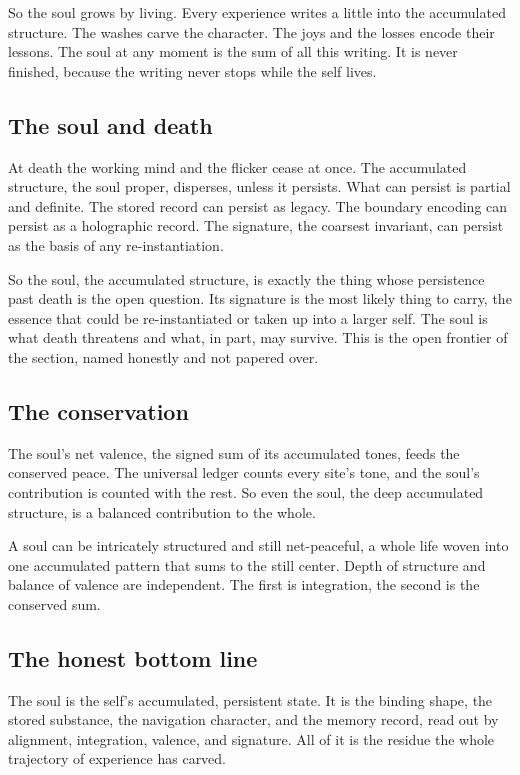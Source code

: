 So the soul grows by living. Every experience writes a little into the accumulated structure. The washes carve the character. The joys and the losses encode their lessons. The soul at any moment is the sum of all this writing. It is never finished, because the writing never stops while the self lives.

\subsection{The soul and death}

At death the working mind and the flicker cease at once. The accumulated structure, the soul proper, disperses, unless it persists. What can persist is partial and definite. The stored record can persist as legacy. The boundary encoding can persist as a holographic record. The signature, the coarsest invariant, can persist as the basis of any re-instantiation.

So the soul, the accumulated structure, is exactly the thing whose persistence past death is the open question. Its signature is the most likely thing to carry, the essence that could be re-instantiated or taken up into a larger self. The soul is what death threatens and what, in part, may survive. This is the open frontier of the section, named honestly and not papered over.

\subsection{The conservation}

The soul's net valence, the signed sum of its accumulated tones, feeds the conserved peace. The universal ledger counts every site's tone, and the soul's contribution is counted with the rest. So even the soul, the deep accumulated structure, is a balanced contribution to the whole.

A soul can be intricately structured and still net-peaceful, a whole life woven into one accumulated pattern that sums to the still center. Depth of structure and balance of valence are independent. The first is integration, the second is the conserved sum.

\subsection{The honest bottom line}

The soul is the self's accumulated, persistent state. It is the binding shape, the stored substance, the navigation character, and the memory record, read out by alignment, integration, valence, and signature. All of it is the residue the whole trajectory of experience has carved.

